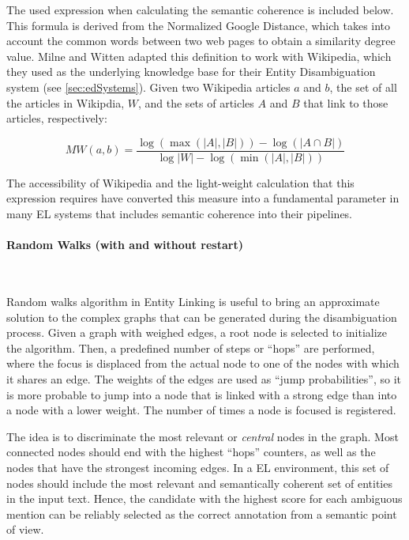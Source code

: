 The used expression when calculating the semantic coherence is included below. This formula is derived from the Normalized Google Distance, which takes into account the common words between two web pages to obtain a similarity degree value. Milne and Witten adapted this definition to work with Wikipedia, which they used as the underlying knowledge base for their Entity Disambiguation system (see \autoref{sec:edSystems}). Given two Wikipedia articles $a$ and $b$, the set of all the articles in Wikipdia, $W$, and the sets of articles $A$ and $B$ that link to those articles, respectively:

\begin{equation}
MW(a,b) = \frac{\log{(\max{(|A|,|B|)})}-\log{(|A \cap B|)}}{\log{|W|} - \log{(\min{(|A|,|B|)})}}
\end{equation}

The accessibility of Wikipedia and the light-weight calculation that this expression requires have converted this measure into a fundamental parameter in many EL systems that includes semantic coherence into their pipelines.

\paragraph{Random Walks (with and without restart)}~

Random walks algorithm in Entity Linking is useful to bring an approximate solution to the complex graphs that can be generated during the disambiguation process. Given a graph with weighed edges, a root node is selected to initialize the algorithm. Then, a predefined number of steps or ``hops'' are performed, where the focus is displaced from the actual node to one of the nodes with which it shares an edge. The weights of the edges are used as ``jump probabilities'', so it is more probable to jump into a node that is linked with a strong edge than into a node with a lower weight. The number of times a node is focused is registered. 

The idea is to discriminate the most relevant or \emph{central} nodes in the graph. Most connected nodes should end with the highest ``hops'' counters, as well as the nodes that have the strongest incoming edges. In a EL environment, this set of nodes should include the most relevant and semantically coherent set of entities in the input text. Hence, the candidate with the highest score for each ambiguous mention can be reliably selected as the correct annotation from a semantic point of view.

